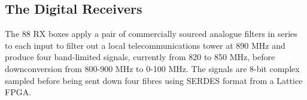 \subsection{The Digital Receivers}
The 88 RX boxes apply a pair of commercially sourced analogue filters in series to each input to filter out a local telecommunications tower at 890 MHz and produce four band-limited signals, currently from 820 to 850 MHz, before downconversion from 800-900 MHz to 0-100 MHz. The signals are 8-bit complex sampled before being sent down four fibres using SERDES format from a Lattice FPGA.

  
  
  